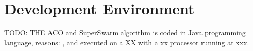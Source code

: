\section{Development Environment}

TODO: THE ACO and SuperSwarm algorithm is coded in Java programming language, reasons: , and executed on a XX with a xx processor running at xxx.